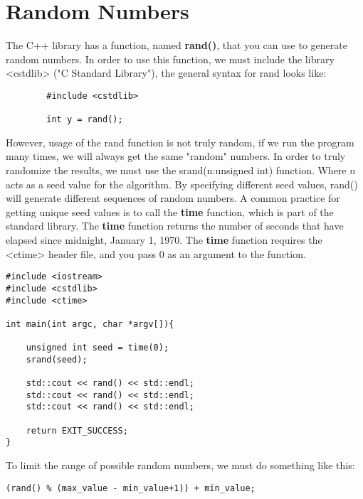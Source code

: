 \documentclass{report}
\begin{document}
    \bigbreak \noindent 

    \pagebreak \bigbreak \noindent 
    \section{\LARGE Random Numbers}
    \bigbreak \noindent 
    The C++ library has a function, named \textbf{rand()}, that you can use to generate random numbers. In order to use this function, we must include the library <cstdlib> ("C Standard Library"), the general syntax for rand looks like:
    \smallbreak \noindent
    \sepline
    \begin{verbatim}
        #include <cstdlib>
        
        int y = rand();
    \end{verbatim}
    \sepline
    \bigbreak \noindent 
    However, usage of the rand function is not truly random, if we run the program many times, we will always get the same "random" numbers. In order to truly randomize the results, we must use the srand(n:unsigned int) function. Where $n$ acts as a seed value for the algorithm. By specifying different seed values, rand() will generate different sequences of random numbers.
    \bigbreak \noindent 
    A common practice for getting unique seed values is to call the \textbf{time} function, which is part of the standard library. The \textbf{time} function returns the number of seconds that have elapsed since midnight, January 1, 1970. The \textbf{time} function requires the <ctime> header file, and you pass 0 as an argument to the function.
    \smallbreak \noindent
    \sepline
    \begin{verbatim}
#include <iostream>
#include <cstdlib>
#include <ctime>

int main(int argc, char *argv[]){

    unsigned int seed = time(0);
    srand(seed);

    std::cout << rand() << std::endl; 
    std::cout << rand() << std::endl; 
    std::cout << rand() << std::endl; 

    return EXIT_SUCCESS;
}
    \end{verbatim}
    \sepline
    \bigbreak \noindent 
    To limit the range of possible random numbers, we must do something like this:
    \smallbreak \noindent
    \sepline
    \begin{verbatim}
(rand() % (max_value - min_value+1)) + min_value;   
    \end{verbatim}
    \sepline

















    
\end{document}
